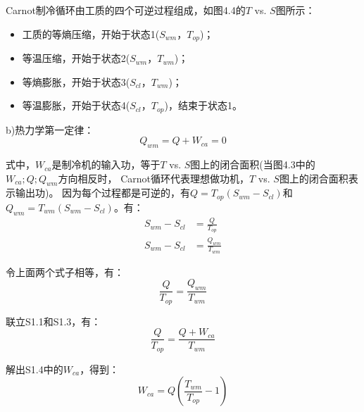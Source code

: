 Carnot制冷循环由工质的四个可逆过程组成，如图4.4的$T$ vs. $S$图所示：
\begin{itemize}
	\item 工质的等熵压缩，开始于状态1($S_{wm}，T_{op}$)；
	\item 等温压缩，开始于状态2($S_{wm}，T_{wm}$)；
	\item 等熵膨胀，开始于状态3($S_{cl}，T_{wm}$)；
	\item 等温膨胀，开始于状态4($S_{cl}，T_{op}$)，结束于状态1。
\end{itemize}

b)热力学第一定律：
\begin{equation*}%
Q_{wm}=Q+W_{ca}=0 \tag{S1.1}
\end{equation*}

式中，$W_{ca}$是制冷机的输入功，等于$T$ vs. $S$图上的闭合面积(当图4.3中的$W_{ca}; Q; Q_{wm}$方向相反时，
Carnot循环代表理想做功机，$T$ vs. $S$图上的闭合面积表示输出功)。
因为每个过程都是可逆的，有$Q=T_{op}(S_{wm}-S_{cl})$和$Q_{wm}=T_{wm}(S_{wm}-S_{cl})$。有：
\begin{align*}%
S_{wm}-S_{cl}&=\frac{Q}{T_{op}}\tag{S1.2a}\\
S_{wm}-S_{cl}&=\frac{Q_{wm}}{T_{wm}}\tag{S1.2b}
\end{align*}

令上面两个式子相等，有：
\begin{equation}%
\frac{Q}{T_{op}}=\frac{Q_{wm}}{T_{wm}} \tag{S1.3}
\end{equation}

联立S1.1和S1.3，有：
\begin{equation*}%
\frac{Q}{T_{op}}=\frac{Q+W_{ca}}{T_{wm}} \tag{S1.4}
\end{equation*}

解出S1.4中的$W_{ca}$，得到：
\begin{equation*}%
W_{ca}=Q(\frac{T_{wm}}{T_{op}}-1) \tag{4.1}
\end{equation*}

